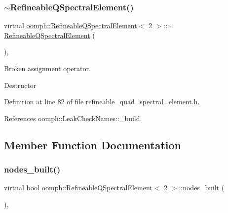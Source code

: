 \subsubsection{\texorpdfstring{$\sim$\+Refineable\+Q\+Spectral\+Element()}{~RefineableQSpectralElement()}}
{\footnotesize\ttfamily virtual \hyperlink{classoomph_1_1RefineableQSpectralElement}{oomph\+::\+Refineable\+Q\+Spectral\+Element}$<$ 2 $>$\+::$\sim$\hyperlink{classoomph_1_1RefineableQSpectralElement}{Refineable\+Q\+Spectral\+Element} (\begin{DoxyParamCaption}{ }\end{DoxyParamCaption})\hspace{0.3cm}{\ttfamily [inline]}, {\ttfamily [virtual]}}



Broken assignment operator. 

Destructor 

Definition at line 82 of file refineable\+\_\+quad\+\_\+spectral\+\_\+element.\+h.



References oomph\+::\+Leak\+Check\+Names\+::\+\_\+build.



\subsection{Member Function Documentation}
\mbox{\label{classoomph_1_1RefineableQSpectralElement_3_012_01_4_a3437e444db1a3d4000ce6c9f73102206}} 
\subsubsection{\texorpdfstring{nodes\+\_\+built()}{nodes\_built()}}
{\footnotesize\ttfamily virtual bool \hyperlink{classoomph_1_1RefineableQSpectralElement}{oomph\+::\+Refineable\+Q\+Spectral\+Element}$<$ 2 $>$\+::nodes\+\_\+built (\begin{DoxyParamCaption}{ }\end{DoxyParamCaption})\hspace{0.3cm}{\ttfamily [inline]}, {\ttfamily [virtual]}}



